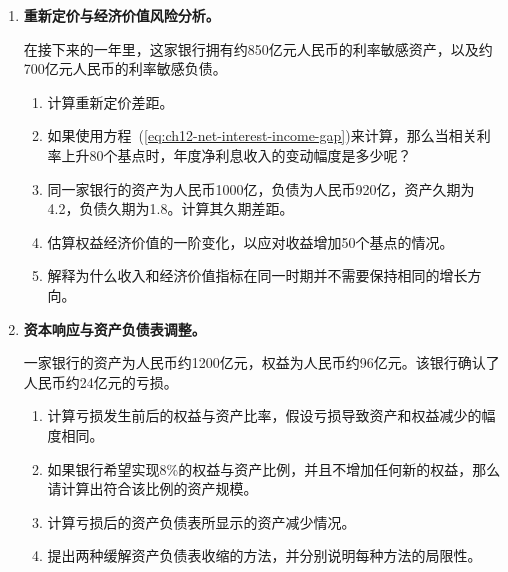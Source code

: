 \begin{enumerate}
\begin{enumerate}
\item 根据方程~(\ref{eq:ch12-liquidity-capacity})计算流动性能力。
\item 所宣称的产能是否足以满足输出需求呢？
\item 如果银行使用所有储备金以及通过证券销售获得的约70亿元人民币现金，那么在上述假设下，还剩下多少流动资金呢？
\item 如果证券投资组合中的部分证券已经被用作抵押品，那么答案将会如何改变？
\end{enumerate}


\item \textbf{重新定价与经济价值风险分析。}


在接下来的一年里，这家银行拥有约850亿元人民币的利率敏感资产，以及约700亿元人民币的利率敏感负债。

\begin{enumerate}
\item 计算重新定价差距。
\item 如果使用方程~(\ref{eq:ch12-net-interest-income-gap})来计算，那么当相关利率上升80个基点时，年度净利息收入的变动幅度是多少呢？
\item 同一家银行的资产为人民币1000亿，负债为人民币920亿，资产久期为4.2，负债久期为1.8。计算其久期差距。
\item 估算权益经济价值的一阶变化，以应对收益增加50个基点的情况。
\item 解释为什么收入和经济价值指标在同一时期并不需要保持相同的增长方向。
\end{enumerate}

\item \textbf{资本响应与资产负债表调整。}

一家银行的资产为人民币约1200亿元，权益为人民币约96亿元。该银行确认了人民币约24亿元的亏损。

\begin{enumerate}
\item 计算亏损发生前后的权益与资产比率，假设亏损导致资产和权益减少的幅度相同。
\item 如果银行希望实现8\%的权益与资产比例，并且不增加任何新的权益，那么请计算出符合该比例的资产规模。
\item 计算亏损后的资产负债表所显示的资产减少情况。
\item 提出两种缓解资产负债表收缩的方法，并分别说明每种方法的局限性。
\end{enumerate}

\end{enumerate}


